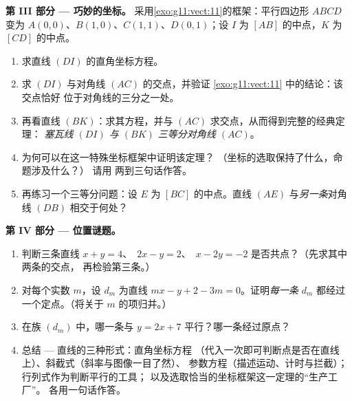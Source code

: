 \begin{problem}
\medskip
\noindent\textbf{第 III 部分 --- 巧妙的坐标。}
采用\cref{exo:g11:vect:11}的框架：平行四边形
$ABCD$ 变为 $A(0,0)$、$B(1,0)$、$C(1,1)$、$D(0,1)$；设 $I$
为 $[AB]$ 的中点，$K$ 为 $[CD]$ 的中点。
\begin{enumerate}[resume]
  \item 求直线 $(DI)$ 的直角坐标方程。
  \item 求 $(DI)$ 与对角线 $(AC)$ 的交点，并验证
        \cref{exo:g11:vect:11} 中的结论：该交点恰好
        位于对角线的三分之一处。
  \item 再看直线 $(BK)$：求其方程，并与
        $(AC)$ 求交点，从而得到完整的经典定理：
        \emph{塞瓦线 $(DI)$ 与 $(BK)$ 三等分对角线
        $(AC)$}。
  \item 为何可以在这一特殊坐标框架中证明该定理？
        （坐标的选取保持了什么，命题涉及什么？）
        请用
        两到三句话作答。
  \item 再练习一个三等分问题：设 $E$ 为
        $[BC]$ 的中点。直线 $(AE)$
        与\emph{另一条}对角线 $(DB)$ 相交于何处？
\end{enumerate}

\medskip
\noindent\textbf{第 IV 部分 --- 位置谜题。}
\begin{enumerate}[resume]
  \item 判断三条直线 $x + y = 4$、\ $2x - y = 2$、\
        $x - 2y = -2$ 是否共点？（先求其中两条的交点，
        再检验第三条。）
  \item 对每个实数 $m$，设 $d_m$ 为直线
        $mx - y + 2 - 3m = 0$。证明\emph{每一条} $d_m$
        都经过一个定点。（将关于
        $m$ 的项归并。）
  \item 在族 $(d_m)$ 中，哪一条与
        $y = 2x + 7$ 平行？哪一条经过原点？
  \item 总结 --- 直线的三种形式：直角坐标方程
        （代入一次即可判断点是否在直线上）、斜截式（斜率与图像一目了然）、
        参数方程（描述运动、计时与拦截）；
        行列式作为判断平行的工具；
        以及选取恰当的坐标框架这一定理的“生产工厂”。
        各用一句话作答。
\end{enumerate}
\end{problem}
